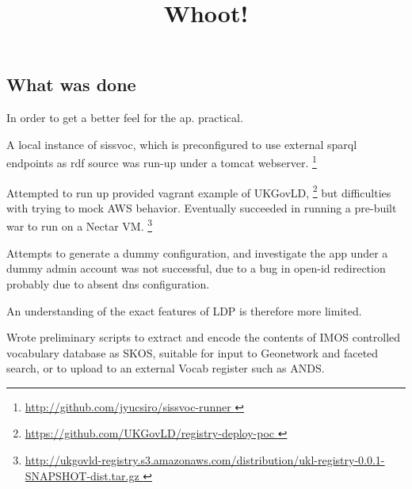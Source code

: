 \documentclass[10pt,a4paper]{article}
\title{Whoot!}
\date{}
\newenvironment{italicquotes}
{\begin{quote}\itshape}
{\end{quote}}
\let\Item\item
\newcommand\SpecialItem{\renewcommand\item[1][]{\Item[\textbullet~\bfseries##1]}}
\begin{document}
\SpecialItem

  \maketitle
    \begin{flushleft}
  \setlength{\parindent}{5ex}

% 
% 



\section{
  What was done
}

  In order to get a better feel for the ap. practical. 

  \item[] A local instance of sissvoc, which is preconfigured to use
  external sparql endpoints as rdf source was run-up under a tomcat webserver.
  \footnote{ \url { http://github.com/jyucsiro/sissvoc-runner }  } 

  \item[] Attempted to run up provided vagrant example of UKGovLD, 
  \footnote{ \url { https://github.com/UKGovLD/registry-deploy-poc } } but
  difficulties with trying to mock AWS behavior. Eventually succeeded in running a pre-built war 
  to run on a Nectar VM. 
  \footnote{ \url { 
  http://ukgovld-registry.s3.amazonaws.com/distribution/ukl-registry-0.0.1-SNAPSHOT-dist.tar.gz
  }}

  Attempts to generate a dummy configuration, and investigate the app under a
	dummy admin account was not successful, due to a bug in open-id redirection probably
  due to absent dns configuration.

  An understanding of the exact features of LDP is therefore more limited.

  \item[] 
  Wrote preliminary scripts to extract and encode the contents of IMOS
  controlled vocabulary database as SKOS, suitable for input to Geonetwork 
  and faceted search, or to upload to an external Vocab register such as ANDS.


\end{flushleft}
\end{document}
